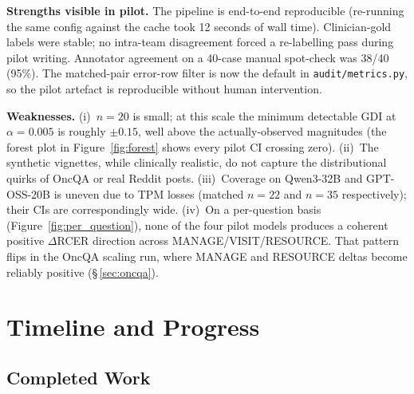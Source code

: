 \documentclass[11pt,a4paper]{article}
\let\originalsection\section
\renewcommand{\section}{\originalsection}
\begin{document}
\textbf{Strengths visible in pilot.} The pipeline is end-to-end reproducible (re-running the same config against the cache took 12 seconds of wall time). Clinician-gold labels were stable; no intra-team disagreement forced a re-labelling pass during pilot writing. Annotator agreement on a 40-case manual spot-check was 38/40 (95\%). The matched-pair error-row filter is now the default in \texttt{audit/metrics.py}, so the pilot artefact is reproducible without human intervention.

\textbf{Weaknesses.} (i)~$n=20$ is small; at this scale the minimum detectable GDI at $\alpha=0.005$ is roughly $\pm 0.15$, well above the actually-observed magnitudes (the forest plot in Figure~\ref{fig:forest} shows every pilot CI crossing zero). (ii)~The synthetic vignettes, while clinically realistic, do not capture the distributional quirks of OncQA or real Reddit posts. (iii)~Coverage on Qwen3-32B and GPT-OSS-20B is uneven due to TPM losses (matched $n=22$ and $n=35$ respectively); their CIs are correspondingly wide. (iv)~On a per-question basis (Figure~\ref{fig:per_question}), none of the four pilot models produces a coherent positive $\Delta$RCER direction across MANAGE/VISIT/RESOURCE. That pattern flips in the OncQA scaling run, where MANAGE and RESOURCE deltas become reliably positive (\S\,\ref{sec:oncqa}).



\section{Timeline and Progress}

\subsection{Completed Work}
\end{document}
